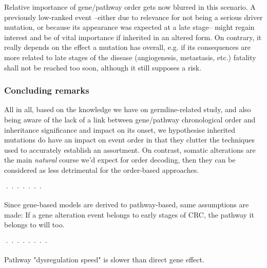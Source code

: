 Relative importance of gene/pathway order gets now blurred in this scenario. A previously low-ranked event --either due to relevance for not being a serious driver mutation, or because its appearance was expected at a late stage-- might regain interest and be of vital importance if inherited in an altered form. On contrary, it really depends on the effect a mutation has overall, e.g. if its consequences are more related to late stages of the disease (angiogenesis, metastasis, etc.) fatality shall not be reached too soon, although it still supposes a risk.
\\

\subsubsection{Concluding remarks}
All in all, based on the knowledge we have on germline-related study, and also being aware of the lack of a link between gene/pathway chronological order and inheritance significance and impact on its onset, we hypothesise inherited mutations do have an impact on event order in that they clutter the techniques used to accurately establish an assortment. On contrast, somatic alterations are the main \emph{natural} course we'd expect for order decoding, then they can be considered as less detrimental for the order-based approaches.










·······

Since gene-based models are derived to pathway-based, same assumptions are made: If a gene alteration event belongs to early stages of CRC, the pathway it belongs to will too.

········

Pathway "dysregulation speed" is slower than direct gene effect.